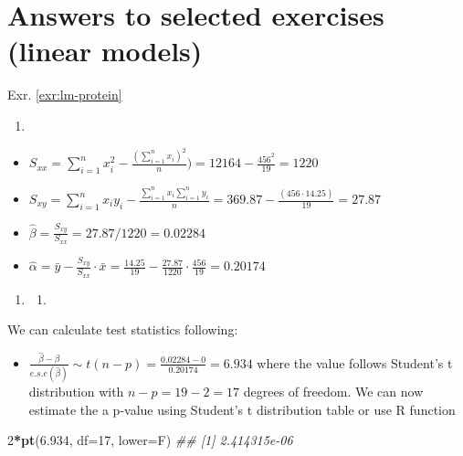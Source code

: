\documentclass[
]{book}
\newenvironment{Shaded}{\begin{snugshade}}{\end{snugshade}}
\newcommand{\CommentTok}[1]{\textcolor[rgb]{0.56,0.35,0.01}{\textit{#1}}}
\newcommand{\DataTypeTok}[1]{\textcolor[rgb]{0.13,0.29,0.53}{#1}}
\newcommand{\DecValTok}[1]{\textcolor[rgb]{0.00,0.00,0.81}{#1}}
\newcommand{\FloatTok}[1]{\textcolor[rgb]{0.00,0.00,0.81}{#1}}
\newcommand{\KeywordTok}[1]{\textcolor[rgb]{0.13,0.29,0.53}{\textbf{#1}}}
\newcommand{\NormalTok}[1]{#1}
\newcommand{\OperatorTok}[1]{\textcolor[rgb]{0.81,0.36,0.00}{\textbf{#1}}}
\providecommand{\tightlist}{%
  \setlength{\itemsep}{0pt}\setlength{\parskip}{0pt}}
\theoremstyle{definition}
\theoremstyle{definition}
\theoremstyle{definition}
\theoremstyle{remark}
\begin{document}
\hypertarget{answers-to-selected-exercises-linear-models}{%
\section*{Answers to selected exercises (linear models)}\label{answers-to-selected-exercises-linear-models}}

Exr. \ref{exr:lm-protein}

\begin{enumerate}
\def\labelenumi{\alph{enumi})}
\tightlist
\item
\end{enumerate}

\begin{itemize}
\tightlist
\item
  \(S_{xx} = \sum_{i=1}^{n}x_i^2-\frac{(\sum_{i=1}^{n}x_i)^2}{n}) = 12164 - \frac{456^2}{19} = 1220\)
\item
  \(S_{xy} = \sum_{i=1}^nx_iy_i-\frac{\sum_{i=1}^{n}x_i\sum_{i=1}^{n}y_i}{n} = 369.87 - \frac{(456 \cdot 14.25)}{19} = 27.87\)
\item
  \(\hat{\beta} = \frac{S_{xy}}{S_{xx}} = 27.87 / 1220 = 0.02284\)
\item
  \(\hat{\alpha} = \bar{y}-\frac{S_{xy}}{S_{xx}}\cdot \bar{x} = \frac{14.25}{19}-\frac{27.87}{1220}\cdot \frac{456}{19} = 0.20174\)
\end{itemize}

\begin{enumerate}
\def\labelenumi{\alph{enumi})}
\setcounter{enumi}{1}
\item
  \begin{enumerate}
  \def\labelenumii{\roman{enumii}.}
  \tightlist
  \item
  \end{enumerate}
\end{enumerate}

We can calculate test statistics following:

\begin{itemize}
\tightlist
\item
  \(\frac{\hat{\beta} - \beta}{e.s.e(\hat{\beta})} \sim t(n-p) = \frac{0.02284 - 0}{0.20174} = 6.934\) where the value follows Student's t distribution with \(n-p = 19 - 2 = 17\) degrees of freedom. We can now estimate the a p-value using Student's t distribution table or use R function
\end{itemize}

\begin{Shaded}
\begin{Highlighting}[]
\DecValTok{2}\OperatorTok{*}\KeywordTok{pt}\NormalTok{(}\FloatTok{6.934}\NormalTok{, }\DataTypeTok{df=}\DecValTok{17}\NormalTok{, }\DataTypeTok{lower=}\NormalTok{F)}
\CommentTok{\#\# [1] 2.414315e{-}06}
\end{Highlighting}
\end{Shaded}
\end{document}
